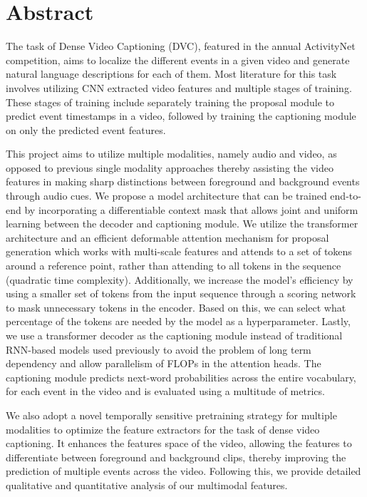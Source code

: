 \documentclass[]{book}
\begin{document}
\chapter*{Abstract}
\par The task of Dense Video Captioning (DVC), featured in the annual ActivityNet competition, aims to localize the different events in a given video and generate natural language descriptions for each of them. Most literature for this task involves utilizing CNN extracted video features and multiple stages of training. These stages of training include separately training the proposal module to predict event timestamps in a video, followed by training the captioning module on only the predicted event features.
\par This project aims to utilize multiple modalities, namely audio and video, as opposed to previous single modality approaches thereby assisting the video features in making sharp distinctions between foreground and background events through audio cues. We propose a model architecture that can be trained end-to-end by incorporating a differentiable context mask that allows joint and uniform learning between the decoder and captioning module. We utilize the transformer architecture and an efficient deformable attention mechanism for proposal generation which works with multi-scale features and attends to a set of tokens around a reference point, rather than attending to all tokens in the sequence (quadratic time complexity). Additionally, we increase the model's efficiency by using a smaller set of tokens from the input sequence through a scoring network to mask unnecessary tokens in the encoder. Based on this, we can select what percentage of the tokens are needed by the model as a hyperparameter. Lastly, we use a transformer decoder as the captioning module instead of traditional RNN-based models used previously to avoid the problem of long term dependency and allow parallelism of FLOPs in the attention heads. The captioning module predicts next-word probabilities across the entire vocabulary, for each event in the video and is evaluated using a multitude of metrics.
\par We also adopt a novel temporally sensitive pretraining strategy for multiple modalities to optimize the feature extractors for the task of dense video captioning. It enhances the features space of the video, allowing the features to differentiate between foreground and background clips, thereby improving the prediction of multiple events across the video. Following this, we provide detailed qualitative and quantitative analysis of our multimodal features.
\end{document}

